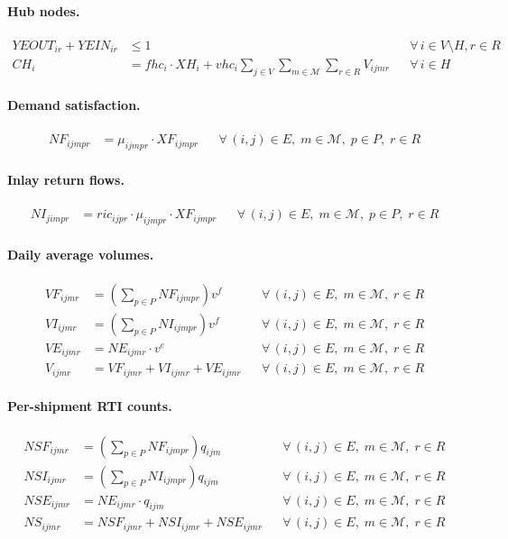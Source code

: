 \begin{ChapterAppendix}
\paragraph{Hub nodes.}
\begin{align}
  YEOUT_{ir} + YEIN_{ir}
    &\leq 1
  && \forall\,i\in V\setminus H, r\in R \\
  CH_i &= fhc_i \cdot XH_i + vhc_i \sum_{j\in V}\sum_{m\in\mathcal{M}}\sum_{r\in R} V_{ijmr}
  && \forall\,i\in H
\end{align}

\paragraph{Demand satisfaction.}
\begin{align}
  NF_{ijmpr} &= \mu_{ijmpr}\cdot XF_{ijmpr}
  && \forall\,(i,j)\in E,\;m\in\mathcal{M},\;p\in P,\;r\in R
\end{align}

\paragraph{Inlay return flows.}
\begin{align}
  NI_{jimpr} &= ric_{ijpr}\cdot\mu_{ijmpr}\cdot XF_{ijmpr}
  && \forall\,(i,j)\in E,\;m\in\mathcal{M},\;p\in P,\;r\in R
\end{align}

\paragraph{Daily average volumes.}
\begin{align}
  VF_{ijmr} &= \left(\sum_{p\in P} NF_{ijmpr}\right) v^f
  && \forall\,(i,j)\in E,\;m\in\mathcal{M},\;r\in R \\
  VI_{ijmr} &= \left(\sum_{p\in P} NI_{ijmpr}\right) v^f
  && \forall\,(i,j)\in E,\;m\in\mathcal{M},\;r\in R \\
  VE_{ijmr} &= NE_{ijmr}\cdot v^e
  && \forall\,(i,j)\in E,\;m\in\mathcal{M},\;r\in R \\
  V_{ijmr}  &= VF_{ijmr}+VI_{ijmr}+VE_{ijmr}
  && \forall\,(i,j)\in E,\;m\in\mathcal{M},\;r\in R
\end{align}

\paragraph{Per-shipment RTI counts.}
\begin{align}
  NSF_{ijmr} &= \left(\sum_{p\in P} NF_{ijmpr}\right) q_{ijm}
  && \forall\,(i,j)\in E,\;m\in\mathcal{M},\;r\in R \\
  NSI_{ijmr} &= \left(\sum_{p\in P} NI_{ijmpr}\right) q_{ijm}
  && \forall\,(i,j)\in E,\;m\in\mathcal{M},\;r\in R \\
  NSE_{ijmr} &= NE_{ijmr}\cdot q_{ijm}
  && \forall\,(i,j)\in E,\;m\in\mathcal{M},\;r\in R \\
  NS_{ijmr}  &= NSF_{ijmr}+NSI_{ijmr}+NSE_{ijmr}
  && \forall\,(i,j)\in E,\;m\in\mathcal{M},\;r\in R
\end{align}


\end{ChapterAppendix}
